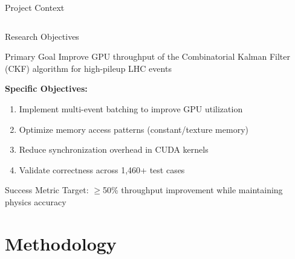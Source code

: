 \documentclass[aspectratio=169, table]{beamer}
\begin{document}
\begin{frame}{Project Context}
\begin{columns}
\end{columns}
\end{frame}

\begin{frame}{Research Objectives}
\begin{block}{Primary Goal}
    Improve GPU throughput of the Combinatorial Kalman Filter (CKF) algorithm for high-pileup LHC events
\end{block}

\vspace{0.5em}
\textbf{Specific Objectives:}
\begin{enumerate}
    \item Implement multi-event batching to improve GPU utilization
    \item Optimize memory access patterns (constant/texture memory)
    \item Reduce synchronization overhead in CUDA kernels
    \item Validate correctness across 1,460+ test cases
\end{enumerate}

\vspace{0.5em}
\begin{alertblock}{Success Metric}
    Target: $\geq$50\% throughput improvement while maintaining physics accuracy
\end{alertblock}
\end{frame}

\section{Methodology}
\end{document}
